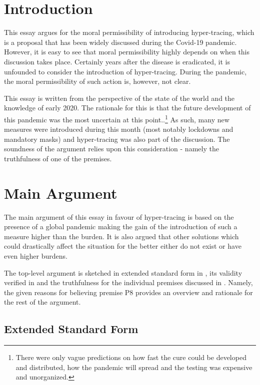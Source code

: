 \section{Introduction}

This essay argues for the moral permissibility of introducing hyper-tracing, which is a proposal that has been widely discussed during the Covid-19 pandemic.
However, it is easy to see that moral permissibility highly depends on when this discussion takes place.
Certainly years after the disease is eradicated, it is unfounded to consider the introduction of hyper-tracing.
During the pandemic, the moral permissibility of such action is, however, not clear.

This essay is written from the perspective of the state of the world and the knowledge of early 2020. The rationale for this is that the future development of this pandemic was the most uncertain at this point..\footnote{There were only vague predictions on how fast the cure could be developed and distributed, how the pandemic will spread and the testing was expensive and unorganized.}
As such, many new measures were introduced during this month (most notably lockdowns and mandatory masks) and hyper-tracing was also part of the discussion.
The soundness of the argument relies upon this consideration - namely the truthfulness of one of the premises.

\section{Main Argument}

The main argument of this essay in favour of hyper-tracing is based on the presence of a global pandemic making the gain of the introduction of such a measure higher than the burden.
It is also argued that other solutions which could drastically affect the situation for the better either do not exist or have even higher burdens.

The top-level argument is sketched in extended standard form in , its validity verified in  and the truthfulness for the individual premises discussed in .
Namely, the given reasons for believing premise P8 provides an overview and rationale for the rest of the argument.

\subsection{Extended Standard Form} \label{subsec:esf}

